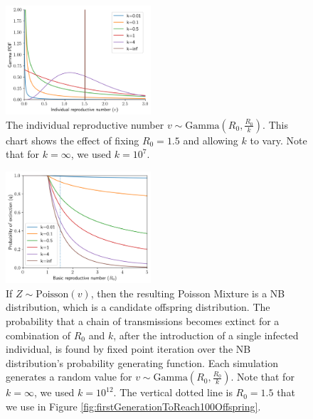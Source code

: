\documentclass[hidelinks]{article}
\begin{document}
\begin{figure}[]
	\begin{mdframed}[backgroundcolor=grey250,rightline=false,leftline=false,topline=false]
    \includegraphics[width=0.48\textwidth, center]{2a_gamma.png}
    \caption{The individual reproductive number $ v \sim \text{Gamma}(R_0, \frac{R_0}{k}) $. This chart shows the effect of fixing $ R_0=1.5 $ and allowing $ k $ to vary. Note that for $ k = \infty $, we used $ k=10^7 $.}
    \label{fig:gamma(R0,R0/k)}
	\end{mdframed}
\end{figure}

\begin{figure}[]
	\begin{mdframed}[backgroundcolor=grey250,rightline=false,leftline=false,topline=false]
    \includegraphics[width=0.48\textwidth, center]{2b_probabilityOfExtinction.png}
    \caption{If $ Z \sim \text{Poisson}(v) $, then the resulting Poisson Mixture is a NB distribution, which is a candidate offspring distribution. The probability that a chain of transmissions becomes extinct for a combination of $R_0$ and $ k $, after the introduction of a single infected individual, is found by fixed point iteration over the NB distribution's probability generating function. Each simulation generates a random value for $ v \sim \text{Gamma}(R_0, \frac{R_0}{k})$. Note that for $ k = \infty $, we used $ k=10^{12} $. The vertical dotted line is $ R_0=1.5$ that we use in Figure \ref{fig:firstGenerationToReach100Offspring}.}
    \label{fig:probabilityOfExtinction}
	\end{mdframed}
\end{figure}
\end{document}
